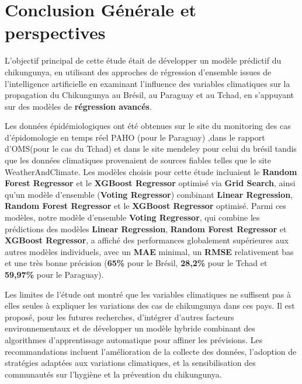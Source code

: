 \chapter*{Conclusion Générale et perspectives}

L'objectif principal de cette étude était de développer un modèle prédictif du chikungunya, en utilisant des approches de régression d'ensemble issues de l'intelligence artificielle en examinant l'influence des variables climatiques sur la propagation du Chikungunya au Brésil, au Paraguay et au Tchad, en s'appuyant sur des modèles de \textbf{régression avancés}. 

Les données épidémiologiques ont été obtenues sur le site du monitoring des cas d'épidomologie en temps réel PAHO (pour le Paraguay) ,dans le rapport d'OMS(pour le cas du Tchad) et dans le site mendeley pour celui du brésil tandis que les données climatiques provenaient de sources fiables telles que le site WeatherAndClimate.  Les modèles choisis pour cette étude incluaient le \textbf{Random Forest Regressor} et le \textbf{XGBoost Regressor} optimisé via \textbf{Grid Search}, ainsi qu'un modèle d'ensemble (\textbf{Voting Regressor}) combinant \textbf{Linear Regression}, \textbf{Random Forest Regressor} et le \textbf{XGBoost Regressor} optimisé. Parmi ces modèles, notre modèle d'ensemble \textbf{Voting Regressor}, qui combine les prédictions des modèles \textbf{Linear Regression}, \textbf{Random Forest Regressor} et \textbf{XGBoost Regressor}, a affiché des performances globalement supérieures aux autres modèles individuels, avec un \textbf{MAE} minimal, un \textbf{RMSE} relativement bas et une très bonne précision (\textbf{65\%} pour le Brésil, \textbf{28,2\%} pour le Tchad et \textbf{59,97\%} pour le Paraguay).

Les limites de l’étude ont montré que les variables climatiques ne suffisent pas à elles seules à expliquer les variations des cas de chikungunya dans ces pays. Il est proposé, pour les futures
recherches, d’intégrer d’autres facteurs environnementaux et de développer un modèle hybride combinant des algorithmes d’apprentissage automatique pour affiner les prévisions. Les recommandations incluent l’amélioration de la collecte des données, l’adoption de stratégies adaptées aux variations climatiques, et la sensibilisation des communautés sur l’hygiène et la prévention du chikungunya.







